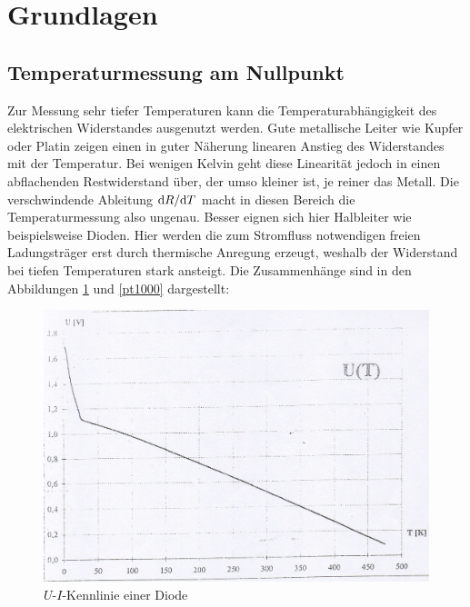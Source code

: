 \section{Grundlagen} %
\label{sec:grundlagen}

	\subsection{Temperaturmessung am Nullpunkt} %
	\label{sub:temperaturmessung_am_nullpunkt}

		Zur Messung sehr tiefer Temperaturen kann die Temperaturabhängigkeit des elektrischen Widerstandes ausgenutzt werden.
		Gute metallische Leiter wie Kupfer oder Platin zeigen einen in guter Näherung linearen Anstieg des Widerstandes mit der Temperatur.
		Bei wenigen Kelvin geht diese Linearität jedoch in einen abflachenden Restwiderstand über, der umso kleiner ist, je reiner das Metall.
		Die verschwindende Ableitung $\mathrm{d} R/\mathrm{d} T$ macht in diesen Bereich die Temperaturmessung also ungenau.
		Besser eignen sich hier Halbleiter wie beispielsweise Dioden.
		Hier werden die zum Stromfluss notwendigen freien Ladungsträger erst durch thermische Anregung erzeugt, weshalb der Widerstand bei tiefen Temperaturen stark ansteigt.
		Die Zusammenhänge sind in den Abbildungen \ref{diodenui} und \ref{pt1000} dargestellt:
		\begin{figure}[H]
			\center
			\includegraphics[scale=0.7]{messwerte/diodenui.jpg}
			\caption{$U$-$I$-Kennlinie einer Diode}
			\label{diodenui}
		\end{figure}
